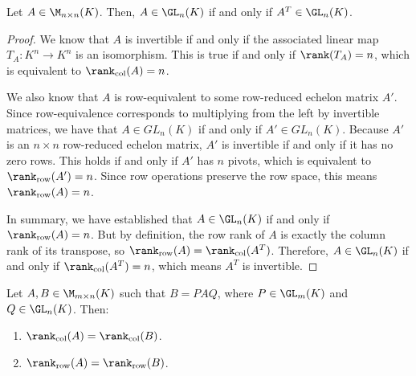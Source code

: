 \begin{lemma}
\label{lemma:transpose_invertibility}
Let $A \in \M_{n \times n}(K)$. Then, $A \in \GL_n(K)$ if and only if $A^T \in \GL_n(K)$.
\end{lemma}

\begin{proof}
We know that $A$ is invertible if and only if the associated linear map $T_A: K^n \to K^n$ is an isomorphism. This is true if and only if $\rank(T_A) = n$, which is equivalent to $\rank_{\text{col}}(A) = n$.

We also know that $A$ is row-equivalent to some row-reduced echelon matrix $A'$. Since row-equivalence corresponds to multiplying from the left by invertible matrices, we have that $A \in GL_n(K)$ if and only if $A' \in GL_n(K)$. Because $A'$ is an $n \times n$ row-reduced echelon matrix, $A'$ is invertible if and only if it has no zero rows. This holds if and only if $A'$ has $n$ pivots, which is equivalent to $\rank_{\text{row}}(A') = n$. Since row operations preserve the row space, this means $\rank_{\text{row}}(A) = n$.

In summary, we have established that $A \in \GL_n(K)$ if and only if $\rank_{\text{row}}(A) = n$. But by definition, the row rank of $A$ is exactly the column rank of its transpose, so $\rank_{\text{row}}(A) = \rank_{\text{col}}(A^T)$. Therefore, $A \in \GL_n(K)$ if and only if $\rank_{\text{col}}(A^T) = n$, which means $A^T$ is invertible.
\end{proof}

\begin{lemma}
\label{lemma:rank_invariance_equivalence}
Let $A, B \in \M_{m \times n}(K)$ such that $B = P A Q$, where $P \in \GL_m(K)$ and $Q \in \GL_n(K)$. Then:
\begin{enumerate}
    \item $\rank_{\text{col}}(A) = \rank_{\text{col}}(B)$.
    \item $\rank_{\text{row}}(A) = \rank_{\text{row}}(B)$.
\end{enumerate}
\end{lemma}

